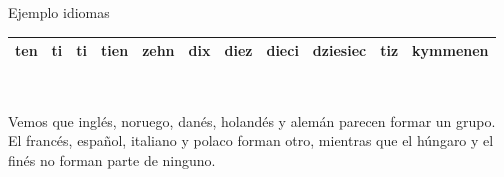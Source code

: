 \documentclass[spanish]{beamer}
\begin{document}
\begin{frame}{Ejemplo idiomas}
\begin{table}[h]
{\begin{tabular}{lllllllllll}
ten                                                  & ti                                                    & ti                                                   & tien                                                    & zehn                                                 & dix                                                    & diez                                                   & dieci                                                  & dziesiec                                             & tiz                                                   & kymmenen                                             \\ \bottomrule
\end{tabular}
}
\end{table}
\end{frame}

\begin{frame}{}
\begin{table}[h]
\centering
{}
\end{table}\

Vemos que inglés, noruego, danés, holandés y alemán parecen formar un grupo. El francés, español, italiano y polaco forman otro, mientras que el húngaro y el finés no forman parte de ninguno.
\end{frame}
\end{document}
